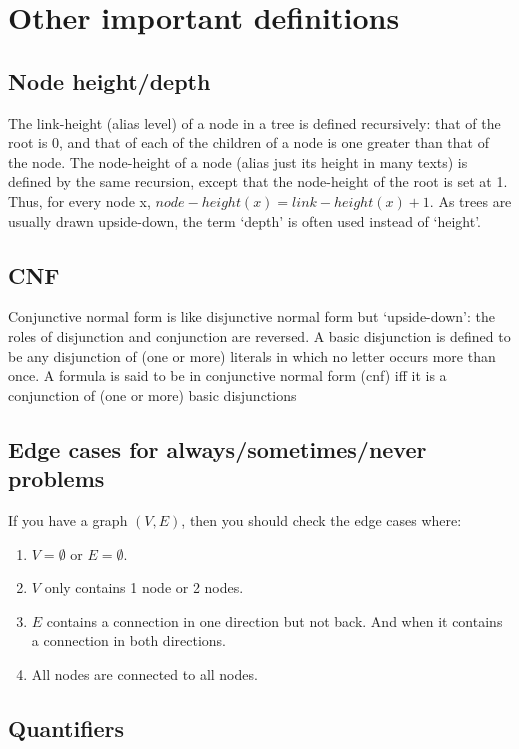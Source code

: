\documentclass[twocolumn,a4paper]{article}
\begin{document}
\newpage
\section*{Other important definitions}
\subsection*{Node height/depth}
The link-height (alias level) of a node in a tree is defined recursively: that of the root is 0,
and that of each of the children of a node is one greater than that of the node.
The node-height of a node (alias just its height in many texts) is defined by the same recursion,
except that the node-height of the root is set at 1.
Thus, for every node x, \(node-height(x) = link-height(x) + 1\).
As trees are usually drawn upside-down, the term `depth' is often used instead of `height'.

\subsection*{CNF}
Conjunctive normal form is like disjunctive normal form but ‘upside-down’: the roles of disjunction and conjunction are reversed. 
A basic disjunction is defined to be any disjunction of (one or more) literals in which no letter occurs more than once.
A formula is said to be in conjunctive normal form (cnf) iff it is a conjunction of (one or more) basic disjunctions

\subsection*{Edge cases for always/sometimes/never problems}
If you have a graph \((V, E)\), then you should check the edge cases where:
\begin{enumerate}
	\item \(V=\emptyset \) or \(E=\emptyset \).
	\item \(V\) only contains 1 node or 2 nodes.
	\item \(E\) contains a connection in one direction but not back. And when it contains a connection in both directions.
	\item All nodes are connected to all nodes.
\end{enumerate}

\subsection*{Quantifiers}
\end{document}
